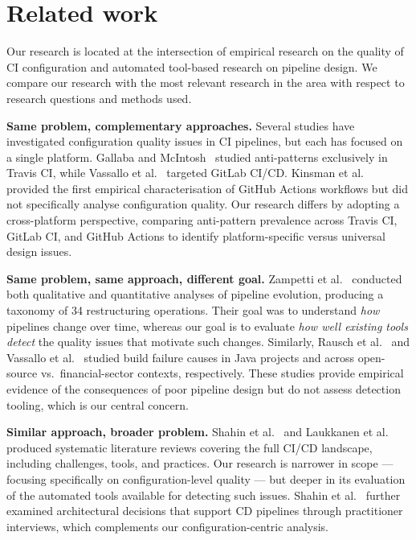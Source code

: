 \documentclass[a4paper,11pt,oneside]{article}
\begin{document}
\section{Related work}

Our research is located at the intersection of empirical research on the quality of CI configuration and automated tool-based research on pipeline design. We compare our research with the most relevant research in the area with respect to research questions and methods used.
\vspace{0.3cm}

\textbf{Same problem, complementary approaches.} Several studies have investigated configuration quality issues in CI pipelines, but each has focused on a single platform. Gallaba and McIntosh~\cite{Gallaba2020} studied anti-patterns exclusively in Travis CI, while Vassallo et al.~\cite{Vassallo2020} targeted GitLab CI/CD. Kinsman et al.~\cite{Kinsman2021} provided the first empirical characterisation of GitHub Actions workflows but did not specifically analyse configuration quality. Our research differs by adopting a cross-platform perspective, comparing anti-pattern prevalence across Travis CI, GitLab CI, and GitHub Actions to identify platform-specific versus universal design issues.
\vspace{0.3cm}

\textbf{Same problem, same approach, different goal.} Zampetti et al.~\cite{Zampetti2021} conducted both qualitative and quantitative analyses of pipeline evolution, producing a taxonomy of 34 restructuring operations. Their goal was to understand \emph{how} pipelines change over time, whereas our goal is to evaluate \emph{how well existing tools detect} the quality issues that motivate such changes. Similarly, Rausch et al.~\cite{Rausch2017} and Vassallo et al.~\cite{Vassallo2017} studied build failure causes in Java projects and across open-source vs.\ financial-sector contexts, respectively. These studies provide empirical evidence of the consequences of poor pipeline design but do not assess detection tooling, which is our central concern.
\vspace{0.3cm}

\textbf{Similar approach, broader problem.} Shahin et al.~\cite{Shahin2017} and Laukkanen et al.~\cite{Laukkanen2017} produced systematic literature reviews covering the full CI/CD landscape, including challenges, tools, and practices. Our research is narrower in scope --- focusing specifically on configuration-level quality --- but deeper in its evaluation of the automated tools available for detecting such issues. Shahin et al.~\cite{Shahin2019} further examined architectural decisions that support CD pipelines through practitioner interviews, which complements our configuration-centric analysis.
\vspace{0.3cm}
\end{document}
